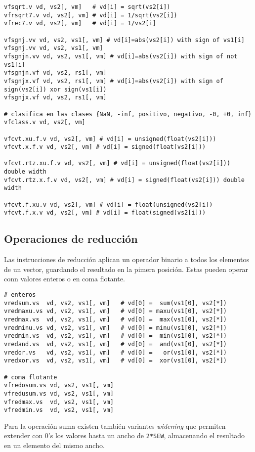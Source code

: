 \begin{lstlisting}
vfsqrt.v vd, vs2[, vm]   # vd[i] = sqrt(vs2[i])
vfrsqrt7.v vd, vs2[, vm] # vd[i] = 1/sqrt(vs2[i])
vfrec7.v vd, vs2[, vm]   # vd[i] = 1/vs2[i]

vfsgnj.vv vd, vs2, vs1[, vm] # vd[i]=abs(vs2[i]) with sign of vs1[i]
vfsgnj.vv vd, vs2, vs1[, vm]
vfsgnjn.vv vd, vs2, vs1[, vm] # vd[i]=abs(vs2[i]) with sign of not vs1[i]
vfsgnjn.vf vd, vs2, rs1[, vm]
vfsgnjx.vf vd, vs2, rs1[, vm] # vd[i]=abs(vs2[i]) with sign of sign(vs2[i]) xor sign(vs1[i])
vfsgnjx.vf vd, vs2, rs1[, vm]

# clasifica en las clases {NaN, -inf, positivo, negativo, -0, +0, inf}
vfclass.v vd, vs2[, vm] 

vfcvt.xu.f.v vd, vs2[, vm] # vd[i] = unsigned(float(vs2[i]))
vfcvt.x.f.v vd, vs2[, vm] # vd[i] = signed(float(vs2[i]))

vfcvt.rtz.xu.f.v vd, vs2[, vm] # vd[i] = unsigned(float(vs2[i])) double width
vfcvt.rtz.x.f.v vd, vs2[, vm] # vd[i] = signed(float(vs2[i])) double width

vfcvt.f.xu.v vd, vs2[, vm] # vd[i] = float(unsigned(vs2[i])
vfcvt.f.x.v vd, vs2[, vm] # vd[i] = float(signed(vs2[i]))
\end{lstlisting}

\subsection{Operaciones de reducción}
Las instrucciones de reducción aplican un operador binario a todos los elementos de un vector, guardando el resultado en la pimera posición. Estas pueden operar conn valores enteros o en coma flotante.

\begin{lstlisting}
# enteros
vredsum.vs  vd, vs2, vs1[, vm]   # vd[0] =  sum(vs1[0], vs2[*])
vredmaxu.vs vd, vs2, vs1[, vm]   # vd[0] = maxu(vs1[0], vs2[*])
vredmax.vs  vd, vs2, vs1[, vm]   # vd[0] =  max(vs1[0], vs2[*])
vredminu.vs vd, vs2, vs1[, vm]   # vd[0] = minu(vs1[0], vs2[*])
vredmin.vs  vd, vs2, vs1[, vm]   # vd[0] =  min(vs1[0], vs2[*])
vredand.vs  vd, vs2, vs1[, vm]   # vd[0] =  and(vs1[0], vs2[*])
vredor.vs   vd, vs2, vs1[, vm]   # vd[0] =   or(vs1[0], vs2[*])
vredxor.vs  vd, vs2, vs1[, vm]   # vd[0] =  xor(vs1[0], vs2[*])

# coma flotante
vfredosum.vs vd, vs2, vs1[, vm]
vfredusum.vs vd, vs2, vs1[, vm]
vfredmax.vs  vd, vs2, vs1[, vm]
vfredmin.vs  vd, vs2, vs1[, vm]
\end{lstlisting}
Para la operación suma existen también variantes \textit{widening} que permiten
extender con 0's los valores hasta un ancho de \texttt{2*SEW}, almacenando el
resultado en un elemento del mismo ancho.

